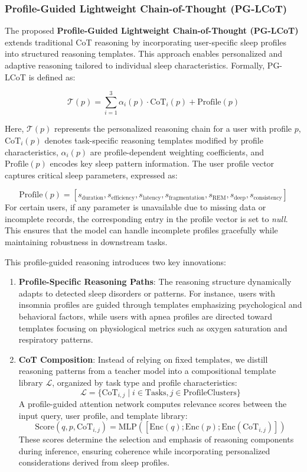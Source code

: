 \documentclass[preprint,12pt]{elsarticle}
\begin{document}
\subsubsection{Profile-Guided Lightweight Chain-of-Thought (PG-LCoT)}

The proposed \textbf{Profile-Guided Lightweight Chain-of-Thought (PG-LCoT)} extends traditional CoT reasoning by incorporating user-specific sleep profiles into structured reasoning templates. This approach enables personalized and adaptive reasoning tailored to individual sleep characteristics. Formally, PG-LCoT is defined as:

\[
\mathcal{T}(p) = \sum_{i=1}^{3} \alpha_i(p) \cdot \text{CoT}_i(p) + \text{Profile}(p)
\]

Here, $\mathcal{T}(p)$ represents the personalized reasoning chain for a user with profile $p$, $\text{CoT}_i(p)$ denotes task-specific reasoning templates modified by profile characteristics, $\alpha_i(p)$ are profile-dependent weighting coefficients, and $\text{Profile}(p)$ encodes key sleep pattern information. The user profile vector captures critical sleep parameters, expressed as:

\[
\text{Profile}(p) = [s_{\text{duration}}, s_{\text{efficiency}}, s_{\text{latency}}, s_{\text{fragmentation}}, s_{\text{REM}}, s_{\text{deep}}, s_{\text{consistency}}]
\]
For certain users, if any parameter is unavailable due to missing data or incomplete records, the corresponding entry in the profile vector is set to \textit{null}. This ensures that the model can handle incomplete profiles gracefully while maintaining robustness in downstream tasks.

This profile-guided reasoning introduces two key innovations:
\begin{enumerate}
    \item \textbf{Profile-Specific Reasoning Paths}:  
    The reasoning structure dynamically adapts to detected sleep disorders or patterns. For instance, users with insomnia profiles are guided through templates emphasizing psychological and behavioral factors, while users with apnea profiles are directed toward templates focusing on physiological metrics such as oxygen saturation and respiratory patterns.

    \item \textbf{CoT Composition}:  
    Instead of relying on fixed templates, we distill reasoning patterns from a teacher model into a compositional template library $\mathcal{L}$, organized by task type and profile characteristics:
    \begin{equation}
    \mathcal{L} = \{\text{CoT}_{i,j} \mid i \in \text{Tasks}, j \in \text{ProfileClusters}\}
    \end{equation}
    A profile-guided attention network computes relevance scores between the input query, user profile, and template library:
    \[
    \text{Score}(q, p, \text{CoT}_{i,j}) = \text{MLP}([\text{Enc}(q); \text{Enc}(p); \text{Enc}(\text{CoT}_{i,j})])
    \]
    These scores determine the selection and emphasis of reasoning components during inference, ensuring coherence while incorporating personalized considerations derived from sleep profiles.
\end{enumerate}
\end{document}
